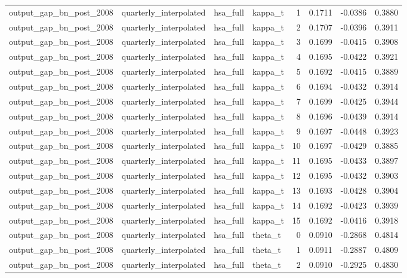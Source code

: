 \begin{tabular}{llllrrrr}
output\_gap\_bn\_post\_2008 & quarterly\_interpolated & hsa\_full & kappa\_t & 1 & 0.1711 & -0.0386 & 0.3880 \\
output\_gap\_bn\_post\_2008 & quarterly\_interpolated & hsa\_full & kappa\_t & 2 & 0.1707 & -0.0396 & 0.3911 \\
output\_gap\_bn\_post\_2008 & quarterly\_interpolated & hsa\_full & kappa\_t & 3 & 0.1699 & -0.0415 & 0.3908 \\
output\_gap\_bn\_post\_2008 & quarterly\_interpolated & hsa\_full & kappa\_t & 4 & 0.1695 & -0.0422 & 0.3921 \\
output\_gap\_bn\_post\_2008 & quarterly\_interpolated & hsa\_full & kappa\_t & 5 & 0.1692 & -0.0415 & 0.3889 \\
output\_gap\_bn\_post\_2008 & quarterly\_interpolated & hsa\_full & kappa\_t & 6 & 0.1694 & -0.0432 & 0.3914 \\
output\_gap\_bn\_post\_2008 & quarterly\_interpolated & hsa\_full & kappa\_t & 7 & 0.1699 & -0.0425 & 0.3944 \\
output\_gap\_bn\_post\_2008 & quarterly\_interpolated & hsa\_full & kappa\_t & 8 & 0.1696 & -0.0439 & 0.3914 \\
output\_gap\_bn\_post\_2008 & quarterly\_interpolated & hsa\_full & kappa\_t & 9 & 0.1697 & -0.0448 & 0.3923 \\
output\_gap\_bn\_post\_2008 & quarterly\_interpolated & hsa\_full & kappa\_t & 10 & 0.1697 & -0.0429 & 0.3885 \\
output\_gap\_bn\_post\_2008 & quarterly\_interpolated & hsa\_full & kappa\_t & 11 & 0.1695 & -0.0433 & 0.3897 \\
output\_gap\_bn\_post\_2008 & quarterly\_interpolated & hsa\_full & kappa\_t & 12 & 0.1695 & -0.0432 & 0.3903 \\
output\_gap\_bn\_post\_2008 & quarterly\_interpolated & hsa\_full & kappa\_t & 13 & 0.1693 & -0.0428 & 0.3904 \\
output\_gap\_bn\_post\_2008 & quarterly\_interpolated & hsa\_full & kappa\_t & 14 & 0.1692 & -0.0423 & 0.3939 \\
output\_gap\_bn\_post\_2008 & quarterly\_interpolated & hsa\_full & kappa\_t & 15 & 0.1692 & -0.0416 & 0.3918 \\
output\_gap\_bn\_post\_2008 & quarterly\_interpolated & hsa\_full & theta\_t & 0 & 0.0910 & -0.2868 & 0.4814 \\
output\_gap\_bn\_post\_2008 & quarterly\_interpolated & hsa\_full & theta\_t & 1 & 0.0911 & -0.2887 & 0.4809 \\
output\_gap\_bn\_post\_2008 & quarterly\_interpolated & hsa\_full & theta\_t & 2 & 0.0910 & -0.2925 & 0.4830 \\

\end{tabular}
